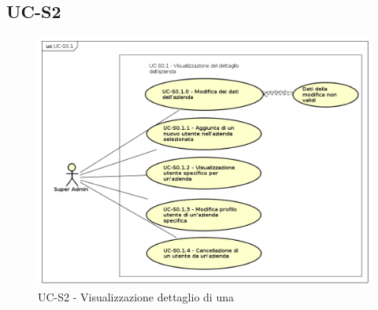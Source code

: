 \subsection{UC-S2}
    \begin{figure}[H]
      \begin{center}
        \includegraphics[width=12cm]{res/img/UCSuperadmin/UCS0.1.png}
      \caption{UC-S2 - Visualizzazione dettaglio di una }
      \end{center} 
    \end{figure}    
    
